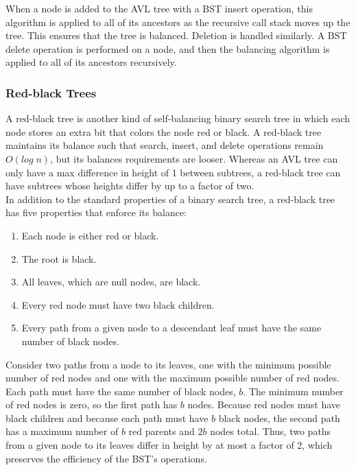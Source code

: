 When a node is added to the AVL tree with a BST insert operation, this algorithm is applied to all of its ancestors as the recursive call stack moves up the tree. This ensures that the tree is balanced. Deletion is handled similarly. A BST delete operation is performed on a node, and then the balancing algorithm is applied to all of its ancestors recursively. \\

\subsubsection{Red-black Trees}

A red-black tree is another kind of self-balancing binary search tree in which each node stores an extra bit that colors the node red or black. A red-black tree maintains its balance such that search, insert, and delete operations remain $O(log\;n)$, but its balances requirements are looser. Whereas an AVL tree can only have a max difference in height of 1 between subtrees, a red-black tree can have subtrees whose heights differ by up to a factor of two. \\

In addition to the standard properties of a binary search tree, a red-black tree has five properties that enforce its balance:

\begin{enumerate}
   \item Each node is either red or black.
   \item The root is black.
   \item All leaves, which are null nodes, are black.
   \item Every red node must have two black children.
   \item Every path from a given node to a descendant leaf must have the same number of black nodes.
\end{enumerate}

Consider two paths from a node to its leaves, one with the minimum possible number of red nodes and one with the maximum possible number of red nodes. Each path must have the same number of black nodes, $b$. The minimum number of red nodes is zero, so the first path has $b$ nodes. Because red nodes must have black children and because each path must have $b$ black nodes, the second path has a maximum number of $b$ red parents and $2b$ nodes total. Thus, two paths from a given node to its leaves differ in height by at most a factor of 2, which preserves the efficiency of the BST's operations. \\

